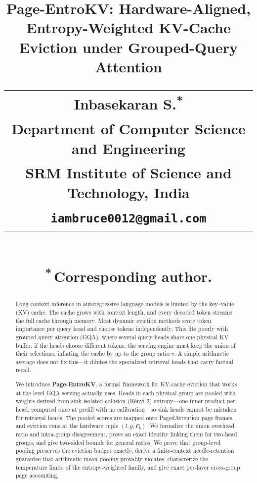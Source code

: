 \documentclass[final,5p,times,twocolumn]{elsarticle}
\theoremstyle{definition}
\theoremstyle{remark}
\begin{document}
\begin{frontmatter}

\title{Page-EntroKV: Hardware-Aligned, Entropy-Weighted KV-Cache
  Eviction under Grouped-Query Attention\\[1.6em]
  {\normalfont\normalsize
    \begin{tabular}{@{}c@{}}
      \textbf{Inbasekaran S.}\textsuperscript{*}\\[3pt]
      Department of Computer Science and Engineering\\
      SRM Institute of Science and Technology, India\\[3pt]
      \texttt{iambruce0012@gmail.com}
    \end{tabular}}%
\\[0.6em]
  {\normalfont\footnotesize
    \textsuperscript{*}\,Corresponding author.}}

\author{}

\begin{abstract}
Long-context inference in autoregressive language models is limited by
the key--value (KV) cache. The cache grows with context length, and
every decoded token streams the full cache through memory. Most dynamic
eviction methods score token importance per query head and choose
tokens independently. This fits poorly with grouped-query attention
(GQA), where several query heads share one physical KV buffer: if the
heads choose different tokens, the serving engine must keep the union
of their selections, inflating the cache by up to the group ratio $r$.
A simple arithmetic average does not fix this---it dilutes the
specialized retrieval heads that carry factual recall.

We introduce \textbf{Page-EntroKV}, a formal framework for KV-cache
eviction that works at the level GQA serving actually uses. Heads in
each physical group are pooled with weights derived from sink-isolated
collision (R\'enyi-2) entropy---one inner product per head, computed
once at prefill with no calibration---so sink heads cannot be mistaken
for retrieval heads. The pooled scores are mapped onto PagedAttention
page frames, and eviction runs at the hardware tuple $(l, g, P_b)$. We
formalize the union overhead ratio and intra-group disagreement, prove
an exact identity linking them for two-head groups, and give two-sided
bounds for general ratios. We prove that group-level pooling preserves
the eviction budget exactly, derive a finite-context needle-retention
guarantee that arithmetic-mean pooling provably violates, characterize
the temperature limits of the entropy-weighted family, and give exact
per-layer cross-group page accounting.


\end{abstract}
\end{frontmatter}
\end{document}
